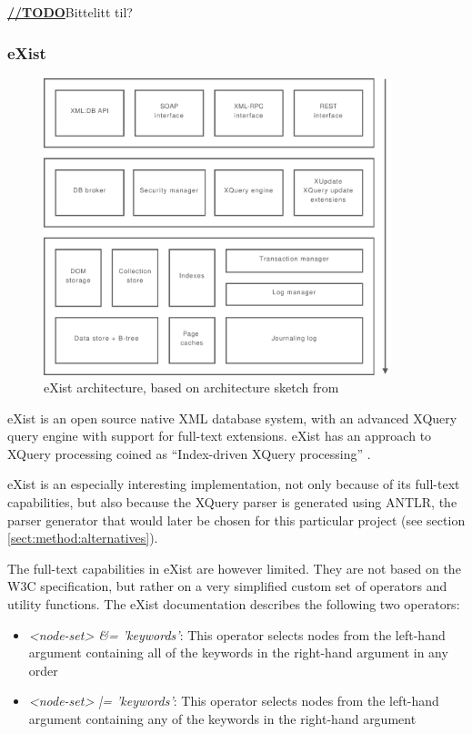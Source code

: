 \underline{\textbf{\LARGE //TODO}}Bittelitt til?

\subsubsection{eXist}
\label{sect:stateOfTheArt:eXist}

\begin{figure}[!h]
  \centering
    \includegraphics[width=0.9\textwidth]{diagrams/exist_arch}
  \caption[eXist architecture]{eXist architecture, based on architecture sketch
  from \cite{exist_indexdriven}}
\end{figure}

eXist is an open source native XML database system, with an advanced XQuery
query engine with support for full-text extensions. eXist has an approach to
XQuery processing coined as ``Index-driven XQuery processing''
\cite{exist_idx_drv_query}.

eXist is an especially interesting implementation, not only because of its
full-text capabilities, but also because the XQuery parser is generated using
ANTLR, the parser generator that would later be chosen for this particular
project (see section \ref{sect:method:alternatives}).

The full-text capabilities in eXist are however limited. They are not based on
the W3C specification, but rather on a very simplified custom set of operators
and utility functions. The eXist documentation\cite{exist_doc} describes the
following two operators:

\begin{itemize}
  \item \emph{<node-set> \&= 'keywords'}: This operator selects nodes from the
  left-hand argument containing all of the keywords in the right-hand argument 
  in any order
  \item \emph{<node-set> |= 'keywords'}: This operator selects nodes from the
  left-hand argument containing any of the keywords in the right-hand argument
\end{itemize}

